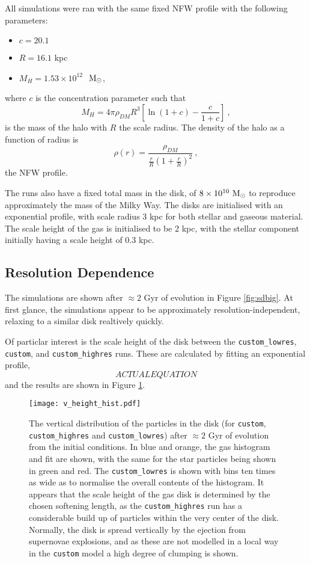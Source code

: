 All simulations were ran with the same fixed NFW profile with the following parameters:
\begin{itemize}
    \item $c = 20.1$
    \item $R = 16.1$ kpc
    \item $M_{H} = 1.53 \times 10^{12}$ $~\mathrm{M}_{\odot}$,
\end{itemize}
where $c$ is the concentration parameter such that
$$
    M_{H} = 4\pi \rho_{DM} R^3 \left[ \ln (1 + c) - \frac{c}{1+c} \right]~,
$$
is the mass of the halo with $R$ the scale radius.
The density of the halo as a function of radius is 
\begin{equation}
    \rho(r) = \frac{\rho_{DM}}{\frac{r}{R} \left( 1 + \frac{r}{R} \right)^2}~,
    \label{eqn:nfw}
\end{equation}
the NFW profile.

The runs also have a fixed total mass in the disk, of $8\times10^{10} ~\mathrm{M}_{\odot}$ to reproduce approximately the mass of the Milky Way.
The disks are initialised with an exponential profile, with scale radius $3$ kpc for both stellar and gaseous material.
The scale height of the gas is initialised to be 2 kpc, with the stellar component initially having a scale height of 0.3 kpc.

\subsection{Resolution Dependence}

The simulations are shown after $\approx 2$ Gyr of evolution in Figure \ref{fig:sdbig}. At first glance, the simulations appear to be approximately resolution-independent, relaxing to a similar disk realtively quickly.

Of particlar interest is the scale height of the disk between the {\tt custom\_lowres}, {\tt custom}, and {\tt custom\_highres} runs.
These are calculated by fitting an exponential profile,
$$
    ACTUAL EQUATION
$$
and the results are shown in Figure \ref{fig:vheighthist}.

\begin{figure}
    \centering
    \texttt{[image: v\_height\_hist.pdf]}
    \caption{The vertical distribution of the particles in the disk (for {\tt custom}, {\tt custom\_highres} and {\tt custom\_lowres}) after $\approx 2$ Gyr of evolution from the initial conditions. In blue and orange, the gas histogram and fit are shown, with the same for the star particles being shown in green and red. The {\tt custom\_lowres} is shown with bins ten times as wide as to normalise the overall contents of the histogram. It appears that the scale height of the gas disk is determined by the chosen softening length, as the {\tt custom\_highres} run has a considerable build up of particles within the very center of the disk. Normally, the disk is spread vertically by the ejection from supernovae explosions, and as these are not modelled in a local way in the {\tt custom} model a high degree of clumping is shown.}
    \label{fig:vheighthist}
\end{figure}

